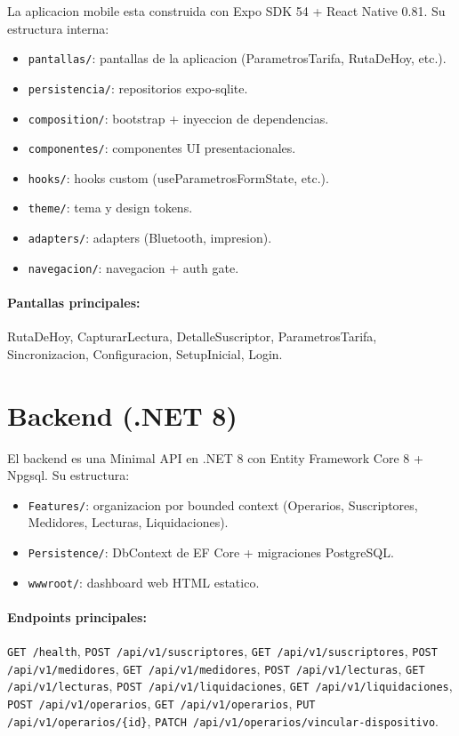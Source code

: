 \documentclass[11pt,a4paper,oneside]{report}
\begin{document}
La aplicacion mobile esta construida con Expo SDK 54 + React Native 0.81. Su estructura interna:

\begin{itemize}[leftmargin=*]
    \item \texttt{pantallas/}: pantallas de la aplicacion (ParametrosTarifa, RutaDeHoy, etc.).
    \item \texttt{persistencia/}: repositorios expo-sqlite.
    \item \texttt{composition/}: bootstrap + inyeccion de dependencias.
    \item \texttt{componentes/}: componentes UI presentacionales.
    \item \texttt{hooks/}: hooks custom (useParametrosFormState, etc.).
    \item \texttt{theme/}: tema y design tokens.
    \item \texttt{adapters/}: adapters (Bluetooth, impresion).
    \item \texttt{navegacion/}: navegacion + auth gate.
\end{itemize}

\paragraph{Pantallas principales:}
RutaDeHoy, CapturarLectura, DetalleSuscriptor, ParametrosTarifa, Sincronizacion, Configuracion, SetupInicial, Login.

\section{Backend (.NET 8)}

El backend es una Minimal API en .NET 8 con Entity Framework Core 8 + Npgsql. Su estructura:

\begin{itemize}[leftmargin=*]
    \item \texttt{Features/}: organizacion por bounded context (Operarios, Suscriptores, Medidores, Lecturas, Liquidaciones).
    \item \texttt{Persistence/}: DbContext de EF Core + migraciones PostgreSQL.
    \item \texttt{wwwroot/}: dashboard web HTML estatico.
\end{itemize}

\paragraph{Endpoints principales:}
\texttt{GET /health}, \texttt{POST /api/v1/suscriptores}, \texttt{GET /api/v1/suscriptores}, \texttt{POST /api/v1/medidores}, \texttt{GET /api/v1/medidores}, \texttt{POST /api/v1/lecturas}, \texttt{GET /api/v1/lecturas}, \texttt{POST /api/v1/liquidaciones}, \texttt{GET /api/v1/liquidaciones}, \texttt{POST /api/v1/operarios}, \texttt{GET /api/v1/operarios}, \texttt{PUT /api/v1/operarios/\{id\}}, \texttt{PATCH /api/v1/operarios/vincular-dispositivo}.
\end{document}
